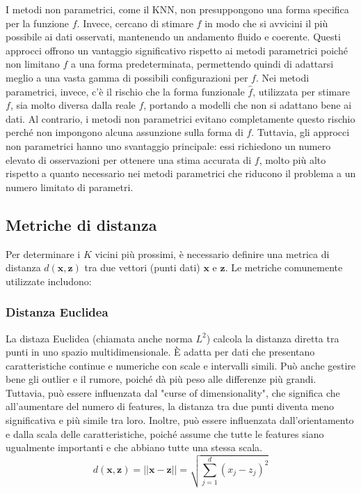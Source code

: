 I metodi non parametrici, come il KNN, non presuppongono una forma 
specifica per la funzione \( f \). Invece, cercano di stimare \( f \) 
in modo che si avvicini il più possibile ai dati osservati, mantenendo 
un andamento fluido e coerente. Questi approcci offrono un vantaggio 
significativo rispetto ai metodi parametrici poiché non limitano \( f \) 
a una forma predeterminata, permettendo quindi di adattarsi meglio a una 
vasta gamma di possibili configurazioni per \( f \). Nei metodi parametrici, 
invece, c'è il rischio che la forma funzionale $\hat{f}$, utilizzata per stimare \( f \), 
sia molto diversa dalla reale \( f \), portando a modelli che non si adattano 
bene ai dati. Al contrario, i metodi non parametrici evitano completamente 
questo rischio perché non impongono alcuna assunzione sulla forma di \( f \). 
Tuttavia, gli approcci non parametrici hanno uno svantaggio principale: 
essi richiedono un numero elevato di osservazioni per ottenere una stima 
accurata di \( f \), molto più alto rispetto a quanto necessario nei metodi 
parametrici che riducono il problema a un numero limitato di parametri.

\subsection{Metriche di distanza}

Per determinare i \( K \) vicini più prossimi, è necessario definire 
una metrica di distanza \( d(\mathbf{x}, \mathbf{z}) \) tra due vettori (punti dati) 
\( \mathbf{x} \) e \( \mathbf{z} \). Le metriche comunemente utilizzate includono:

\subsubsection{Distanza Euclidea} 
La distaza Euclidea (chiamata anche norma $L^2$) calcola la distanza diretta tra punti in uno spazio multidimensionale. 
È adatta per dati 
che presentano caratteristiche continue e numeriche con scale e intervalli simili. 
Può anche gestire bene gli outlier e il rumore, poiché dà più peso alle differenze più grandi. 
Tuttavia, può essere influenzata dal "curse of dimensionality", che significa che all'aumentare 
del numero di features, la distanza tra due punti diventa meno significativa e più simile tra loro.
Inoltre, può essere influenzata dall'orientamento e dalla scala delle 
    caratteristiche, poiché assume che tutte le features siano ugualmente 
    importanti e che abbiano tutte una stessa scala.
    \[
    d(\mathbf{x}, \mathbf{z}) = ||\mathbf{x} - \mathbf{z}|| = \sqrt{\sum_{j=1}^d (x_j - z_j)^2}
    \]

